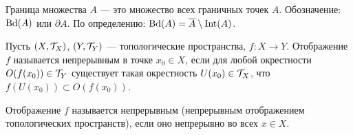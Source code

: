 \begin{definition}
    Граница множества $A$ --- это множество всех граничных точек $A$. Обозначение: $\operatorname{Bd}(A)$ или $\partial A$.
    По определению: $\operatorname{Bd}(A) = \overline{A} \setminus \operatorname{Int}(A)$.
\end{definition}

\begin{definition}
    Пусть $(X, \mathcal{T}_{X})$, $(Y, \mathcal{T}_{Y})$ --- топологические пространства, $f: X \rightarrow Y$. Отображение $f$ называется непрерывным в точке $x_0 \in X$, если для любой окрестности $O(f(x_0)) \in \mathcal{T}_{Y}$ существует такая окрестность $U(x_0) \in \mathcal{T}_{X}$, что $f(U(x_0)) \subset O(f(x_0))$. 

    Отображение $f$ называется непрерывным (непрерывным отображением топологических пространств), если оно непрерывно во всех $x \in X$.
\end{definition}

